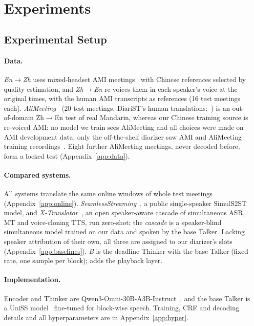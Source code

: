 \section{Experiments}
\label{sec:experiments}

\subsection{Experimental Setup}
\label{sec:setup}

\paragraph{Data.} \emph{En$\rightarrow$Zh} uses mixed-headset AMI meetings~\citep{carletta2005ami} with Chinese
references selected by quality estimation, and \emph{Zh$\rightarrow$En} re-voices them in each speaker's voice at the
original times, with the human AMI transcripts as references (16 test meetings each). \emph{AliMeeting}~\citep{yu2022m2met}
(20 test meetings, DiariST's human translations;~\citealp{yang2024diarist}) is an out-of-domain Zh$\rightarrow$En test of
real Mandarin, whereas our Chinese training source is re-voiced AMI: no model we train sees AliMeeting and all choices
were made on AMI development data; only the off-the-shelf diarizer saw AMI and AliMeeting training
recordings~\citep{medennikov2026nemotron}. Eight further AliMeeting meetings, never decoded before, form a locked test
(Appendix~\ref{app:data}).

\paragraph{Compared systems.} All systems translate the same online windows of whole test meetings
(Appendix~\ref{app:online}). \emph{SeamlessStreaming}~\citep{seamless2023}, a public single-speaker SimulS2ST model, and
\emph{X-Translator}~\citep{zhao2026xtranslator}, an open speaker-aware cascade of simultaneous ASR, MT and voice-cloning
TTS, run zero-shot; the \emph{cascade} is a speaker-blind simultaneous model trained on our data and spoken by the base
Talker. Lacking speaker attribution of their own, all three are assigned to our diarizer's slots
(Appendix~\ref{app:baselines}). \emph{B} is the deadline Thinker with the base Talker (fixed rate, one sample per
block); \sys{} adds the playback layer.

\paragraph{Implementation.} Encoder and Thinker are Qwen3-Omni-30B-A3B-Instruct~\citep{xu2025qwen3omni}, and the base
Talker is a UniSS model~\citep{uniss2025} fine-tuned for block-wise speech. Training, CRF and decoding details and all hyperparameters are in
Appendix~\ref{app:hyper}.

